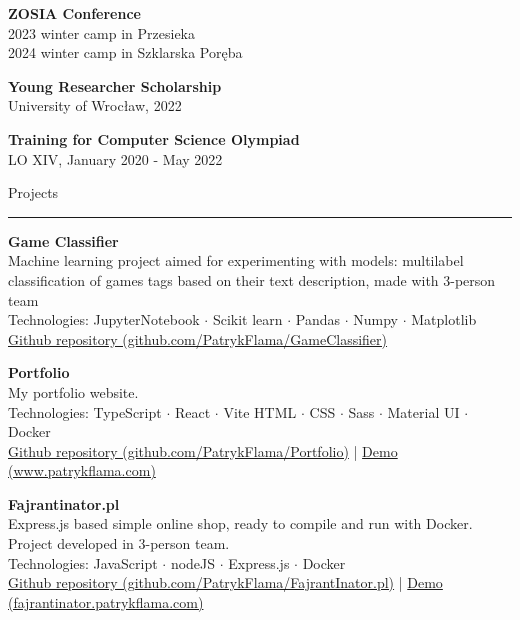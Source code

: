 \documentclass{letter}
\begin{document}
\begin{minipage}[t]{0.70\textwidth}
\begin{tcolorbox}[colback=white, colframe=white, width=\textwidth, boxrule=0pt, sharp corners, height=\textheight, left=5mm, right=5mm, top=5mm, bottom=5mm]
{\vspace{1mm}
\textbf{ZOSIA Conference} \\
{\small 2023 winter camp in Przesieka} \\
{\small 2024 winter camp in Szklarska Poręba}

\vspace{1mm}
\textbf{Young Researcher Scholarship} \\
{\small University of Wrocław, 2022}

\vspace{1mm}
\textbf{Training for Computer Science Olympiad} \\
{\small LO XIV, January 2020 - May 2022}

}


{\large Projects}
\rule{\linewidth}{0.4pt}

{ 

\textbf{Game Classifier}  \\
Machine learning project aimed for experimenting with models: multilabel classification of games tags based on their text description, made with 3-person team \\
{\small Technologies: JupyterNotebook $\cdot$ Scikit learn $\cdot$ Pandas $\cdot$ Numpy $\cdot$ Matplotlib } \\
{\small \href{https://github.com/PatrykFlama/GameClassifier}{Github repository (github.com/PatrykFlama/GameClassifier)}}

\textbf{Portfolio}  \\
My portfolio website. \\
{\small Technologies: TypeScript $\cdot$ React $\cdot$ Vite 
HTML $\cdot$ CSS $\cdot$ Sass $\cdot$ Material UI $\cdot$ Docker } \\
{\small \href{https://github.com/PatrykFlama/Portfolio}{Github repository (github.com/PatrykFlama/Portfolio)}} 
| {\small \href{https://www.patrykflama.com/}{Demo (www.patrykflama.com)}}

\textbf{Fajrantinator.pl}  \\
Express.js based simple online shop, ready to compile and run with Docker. Project developed in 3-person team. \\
{\small Technologies: JavaScript $\cdot$ nodeJS $\cdot$ Express.js $\cdot$ Docker } \\
{\small \href{https://github.com/PatrykFlama/FajrantInator.pl}{Github repository (github.com/PatrykFlama/FajrantInator.pl)}} 
| {\small \href{https://fajrantinator.patrykflama.com/}{Demo (fajrantinator.patrykflama.com)}}

}
\end{tcolorbox}
\end{minipage}
\end{document}
